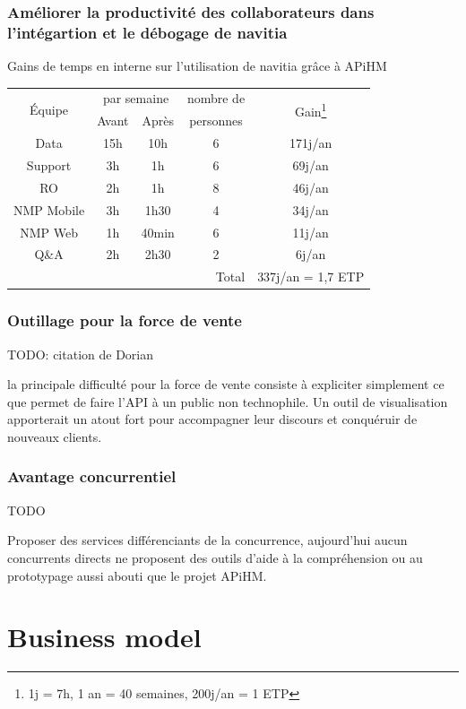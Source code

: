 \documentclass[table]{beamer}
\begin{document}
\begin{frame}
  \frametitle{Améliorer la productivité des collaborateurs dans
    l'intégartion et le débogage de navitia}

  \centering Gains de temps en interne sur l'utilisation de navitia
  grâce à APiHM
  \vfill
  \begin{tabular}{|c|c|c|c|c|}
    \hline
    \multirow{2}{*}{Équipe}& \multicolumn{2}{c|}{par
      semaine}&nombre de&\multirow{2}{*}{Gain\footnote{1j = 7h,
        1 an = 40 semaines, 200j/an = 1 ETP}}\\
    \hhline{~--~~}
    & Avant & Après & personnes &\\
    \hline
    Data       &15h &10h & 6 & 171j/an\\
    Support    & 3h & 1h & 6 &  69j/an\\
    RO         & 2h & 1h & 8 &  46j/an\\
    NMP Mobile & 3h &1h30& 4 &  34j/an\\
    NMP Web    & 1h &40min&6 &  11j/an\\
    Q\&A       & 2h &2h30& 2 &   6j/an\\
    \hline
    \multicolumn{4}{|r|}{Total} &
    337j/an = 1{,}7 ETP\\
    \hline
  \end{tabular}
\end{frame}

\begin{frame}
  \frametitle{Outillage pour la force de vente}

  TODO: citation de Dorian

  la principale difficulté pour la force de vente consiste à
  expliciter simplement ce que permet de faire l'API à un public non
  technophile. Un outil de visualisation apporterait un atout fort
  pour accompagner leur discours et conquéruir de nouveaux clients.
\end{frame}

\begin{frame}
  \frametitle{Avantage concurrentiel}

  TODO

  Proposer des services différenciants de la concurrence, aujourd'hui
  aucun concurrents directs ne proposent des outils d'aide à la
  compréhension ou au prototypage aussi abouti que le projet APiHM.
\end{frame}

\section{Business model}
\end{document}
